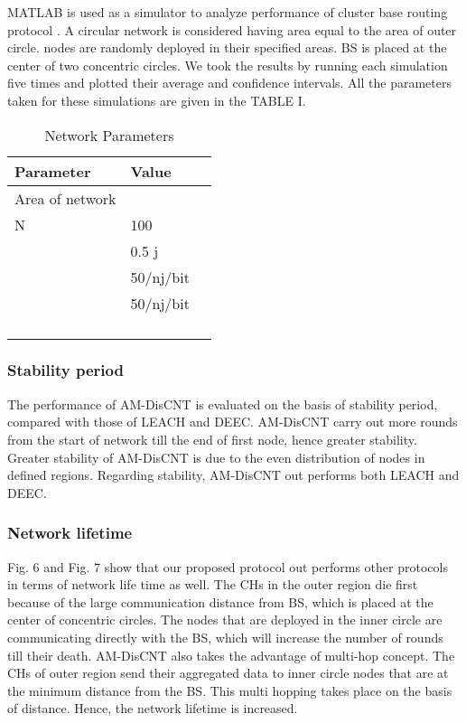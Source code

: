 \documentclass[journal]{IEEEtran}
\begin{document}
 MATLAB is used as a simulator to analyze performance of cluster base routing protocol . A circular network is considered having area equal to the area of outer circle.  nodes are randomly deployed in their specified areas. BS is placed at the center of two concentric circles. We took the results by running each simulation five times and plotted their average and confidence intervals. All the parameters taken for these simulations are given in the TABLE I.
 \begin{table}[htbp]
  \centering
  \caption{Network Parameters}
  \begin{tabular}[height=9cm,width=9cm]{lll}
    \toprule
    Parameter & Value  &  \\
    \midrule
Area of network          &  \\
   N            & 100  \\
            & 0.5 j \\
             & 50/nj/bit \\
            & 50/nj/bit \\
           &  \\
           & \\
            &  \\
         &  \\
     \bottomrule
 \end{tabular}\label{tab:addlabe2}\end{table}
\subsubsection{Stability period}
The performance of AM-DisCNT is evaluated on the basis of stability period, compared with those of LEACH and DEEC. AM-DisCNT carry out more rounds from the start of network till the end of first node, hence greater  stability. Greater stability of AM-DisCNT is due to the even distribution of nodes in defined regions. Regarding stability, AM-DisCNT out performs both LEACH and DEEC.



\subsubsection{Network lifetime}
 Fig. 6 and Fig. 7 show that our proposed protocol out performs other protocols in terms of network life time as well.  The CHs in the outer region die first because of the large communication distance from BS, which is placed at the center of concentric circles. The nodes that are deployed in the inner circle are communicating directly with the BS, which will increase the number of rounds till their death. AM-DisCNT also takes the advantage of multi-hop concept. The CHs of outer region send their aggregated data to inner circle nodes that are at the minimum distance from the BS. This multi hopping takes place on the basis of distance. Hence, the network lifetime is increased.
\end{document}
